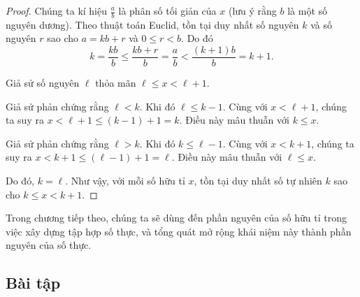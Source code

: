 \begin{proof}
    Chúng ta kí hiệu $\frac{a}{b}$ là phân số tối giản của $x$ (lưu ý rằng $b$ là một số nguyên dương). Theo thuật toán Euclid, tồn tại duy nhất số nguyên $k$ và số nguyên $r$ sao cho $a = kb + r$ và $0\leq r < b$. Do đó
    \[
        k = \frac{kb}{b} \leq \frac{kb + r}{b} = \frac{a}{b} < \frac{(k+1)b}{b} = k+1.
    \]

    Giả sử số nguyên $\ell$ thỏa mãn $\ell\leq x < \ell + 1$.

    Giả sử phản chứng rằng $\ell < k$. Khi đó $\ell\leq k - 1$. Cùng với $x < \ell + 1$, chúng ta suy ra $x < \ell + 1\leq (k-1) + 1 = k$. Điều này mâu thuẫn với $k\leq x$.

    Giả sử phản chứng rằng $\ell > k$. Khi đó $k\leq \ell - 1$. Cùng với $x < k + 1$, chúng ta suy ra $x < k + 1\leq (\ell - 1) + 1 = \ell$. Điều này mâu thuẫn với $\ell\leq x$.

    Do đó, $k = \ell$. Như vậy, với mỗi số hữu tỉ $x$, tồn tại duy nhất số tự nhiên $k$ sao cho $k\leq x < k+1$.
\end{proof}

Trong chương tiếp theo, chúng ta sẽ dùng đến phần nguyên của số hữu tỉ trong việc xây dựng tập hợp số thực, và tổng quát mở rộng khái niệm này thành phần nguyên của số thực.

\subsection{Bài tập}
